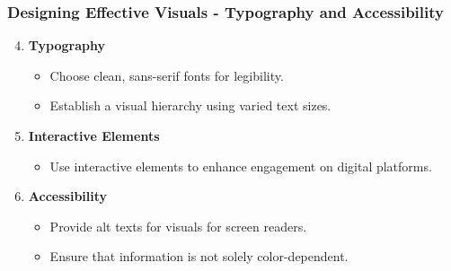 \documentclass{beamer}
\begin{document}
\begin{frame}[fragile]
    \frametitle{Designing Effective Visuals - Typography and Accessibility}
    \begin{enumerate}
        \setcounter{enumi}{3}
        \item \textbf{Typography}
        \begin{itemize}
            \item Choose clean, sans-serif fonts for legibility.
            \item Establish a visual hierarchy using varied text sizes.
        \end{itemize}
        
        \item \textbf{Interactive Elements}
        \begin{itemize}
            \item Use interactive elements to enhance engagement on digital platforms.
        \end{itemize}
        
        \item \textbf{Accessibility}
        \begin{itemize}
            \item Provide alt texts for visuals for screen readers.
            \item Ensure that information is not solely color-dependent.
        \end{itemize}
    \end{enumerate}
\end{frame}
\end{document}
